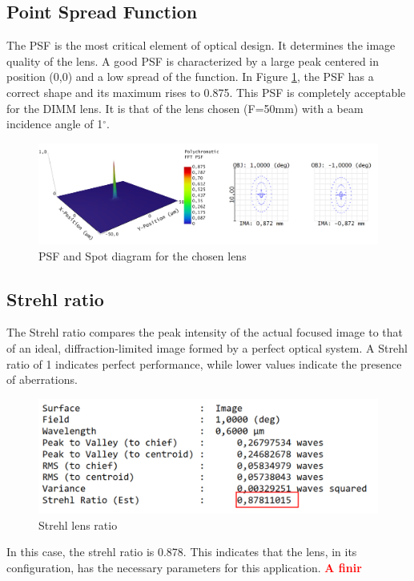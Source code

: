 \subsection{Point Spread Function}
The \gls{PSF} is the most critical element of optical design. It determines the image quality of the lens.
A good \gls{PSF} is characterized by a large peak centered in position (0,0) and a low spread of the function.
\newline
In Figure \ref{fig:Opti_ZemaxPSF}, the \gls{PSF} has a correct shape and its maximum rises to 0.875. This \gls{PSF} is completely acceptable
for the DIMM lens. It is that of the lens chosen (F=50mm) with a beam incidence angle of 1$^{\circ}$.
\begin{figure}[H]
    \centering
    \includegraphics[scale=0.5]{assets/figures/Optical Design/Zemax_PSF.png}
    \caption{PSF and Spot diagram for the chosen lens}
    \label{fig:Opti_ZemaxPSF}
\end{figure}
\subsection{Strehl ratio}
The Strehl ratio compares the peak intensity of the actual focused image to that of an ideal, 
diffraction-limited image formed by a perfect optical system. A Strehl ratio of 1 indicates perfect performance, 
while lower values indicate the presence of aberrations.
\begin{figure}[H]
    \centering
    \includegraphics[scale=0.8]{assets/figures/Optical Design/Zemax_Strehl.png}
    \caption{Strehl lens ratio}
    \label{fig:Opti_ZemaxStrehl}
\end{figure}
In this case, the strehl ratio is 0.878. This indicates that the lens, in its configuration, 
has the necessary parameters for this application. \textbf{\textcolor{red}{A finir}}
\newpage
